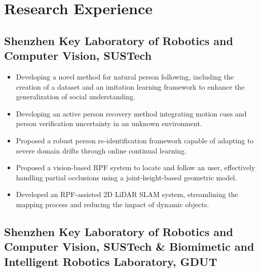 \documentclass[12pt,a4paper,sans]{moderncv} %
\begin{document}

\section{Research Experience}
\subsection{Shenzhen Key Laboratory of Robotics and Computer Vision, SUSTech}
{
  \begin{itemize}
    \item Developing a novel method for natural person following, including the creation of a dataset and an imitation learning framework to enhance the generalization of social understanding.
    \item Developing an active person recovery method integrating motion cues and person verification uncertainty in an unknown environment.
    \item Proposed a robust person re-identification framework capable of adapting to severe domain drifts through online continual learning.
    \item Proposed a vision-based RPF system to locate and follow an user, effectively handling partial occlusions using a joint-height-based geometric model.
    \item Developed an RPF-assisted 2D LiDAR SLAM system, streamlining the mapping process and reducing the impact of dynamic objects.
  \end{itemize}
}

\subsection{Shenzhen Key Laboratory of Robotics and Computer Vision, SUSTech \&  Biomimetic and Intelligent Robotics Laboratory, GDUT}
\end{document}
